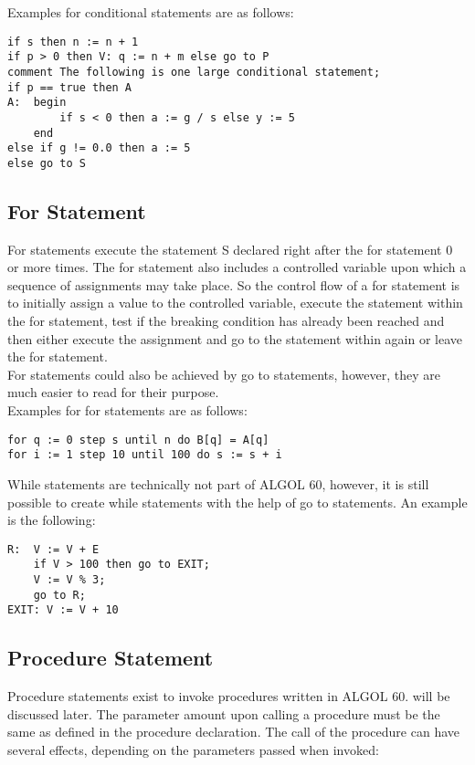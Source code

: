 \documentclass{article}
\begin{document}
Examples for conditional statements are as follows:\\ 
\begin{lstlisting}[language={[60]algol}]
if s then n := n + 1
if p > 0 then V: q := n + m else go to P
comment The following is one large conditional statement;
if p == true then A
A:  begin 
        if s < 0 then a := g / s else y := 5
    end
else if g != 0.0 then a := 5
else go to S
\end{lstlisting}

\subsection{For Statement}
For statements execute the statement S declared right after the for statement 0 or more times. The for statement also includes a controlled variable upon which a sequence of assignments may take place. So the control flow of a for statement is to initially assign a value to the controlled variable, execute the statement within the for statement, test if the breaking condition has already been reached and then either execute the assignment and go to the statement within again or leave the for statement.\\
For statements could also be achieved by go to statements, however, they are much easier to read for their purpose.\\

Examples for for statements are as follows:\\ 
\begin{lstlisting}[language={[60]algol}]
for q := 0 step s until n do B[q] = A[q]
for i := 1 step 10 until 100 do s := s + i
\end{lstlisting}

While statements are technically not part of ALGOL 60, however, it is still possible to create while statements with the help of go to statements. An example is the following:\\

\begin{lstlisting}[language={[60]algol}]
R:  V := V + E
    if V > 100 then go to EXIT;
    V := V % 3;
    go to R;
EXIT: V := V + 10
\end{lstlisting}


\subsection{Procedure Statement} \label{ProcStat}
Procedure statements exist to invoke procedures written in ALGOL 60.  will be discussed later. The parameter amount upon calling a procedure must be the same as defined in the procedure declaration. The call of the procedure can have several effects, depending on the parameters passed when invoked:
\end{document}
